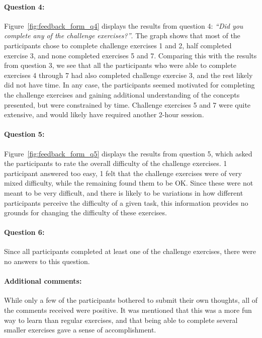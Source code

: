\paragraph{Question 4:} Figure~\ref{fig:feedback_form_q4} displays the results from question 4: \emph{``Did you complete any of the challenge exercises?''}. The graph shows that most of the participants chose to complete challenge exercises 1 and 2, half completed exercise 3, and none completed exercises 5 and 7. Comparing this with the results from question 3, we see that all the participants who were able to complete exercises 4 through 7 had also completed challenge exercise 3, and the rest likely did not have time. In any case, the participants seemed motivated for completing the challenge exercises and gaining additional understanding of the concepts presented, but were constrained by time. Challenge exercises 5 and 7 were quite extensive, and would likely have required another 2-hour session.

\paragraph{Question 5:} Figure~\ref{fig:feedback_form_q5} displays the results from question 5, which asked the participants to rate the overall difficulty of the challenge exercises. 1 participant answered too easy, 1 felt that the challenge exercises were of very mixed difficulty, while the remaining found them to be OK. Since these were not meant to be very difficult, and there is likely to be variations in how different participants perceive the difficulty of a given task, this information provides no grounds for changing the difficulty of these exercises.

\paragraph{Question 6:} Since all participants completed at least one of the challenge exercises, there were no answers to this question.

\paragraph{Additional comments:} While only a few of the participants bothered to submit their own thoughts, all of the comments received were positive. It was mentioned that this was a more fun way to learn than regular exercises, and that being able to complete several smaller exercises gave a sense of accomplishment.


